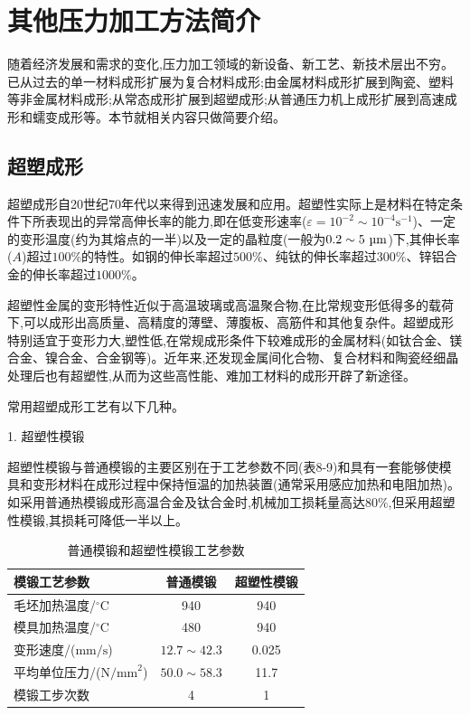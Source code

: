 \documentclass[UTF8]{ctexbook}
\newcommand{\◎}{\ensuremath{\bigcirc}}
\begin{document}
\section{其他压力加工方法简介}
随着经济发展和需求的变化,压力加工领域的新设备、新工艺、新技术层出不穷。已从过去的单一材料成形扩展为复合材料成形;由金属材料成形扩展到陶瓷、塑料等非金属材料成形;从常态成形扩展到超塑成形;从普通压力机上成形扩展到高速成形和蠕变成形等。本节就相关内容只做简要介绍。

\subsection{超塑成形}
超塑成形自20世纪70年代以来得到迅速发展和应用。超塑性实际上是材料在特定条件下所表现出的异常高伸长率的能力,即在低变形速率($\varepsilon=10^{-2}\sim 10^{-4}\text{s}^{-1}$)、一定的变形温度(约为其熔点的一半)以及一定的晶粒度(一般为$0.2\sim 5\text{ \textmu m}$)下,其伸长率($A$)超过$100\%$的特性。如钢的伸长率超过$500\%$、纯钛的伸长率超过$300\%$、锌铝合金的伸长率超过$1000\%$。

超塑性金属的变形特性近似于高温玻璃或高温聚合物,在比常规变形低得多的载荷下,可以成形出高质量、高精度的薄壁、薄腹板、高筋件和其他复杂件。超塑成形特别适宜于变形力大,塑性低,在常规成形条件下较难成形的金属材料(如钛合金、镁合金、镍合金、合金钢等)。近年来,还发现金属间化合物、复合材料和陶瓷经细晶处理后也有超塑性,从而为这些高性能、难加工材料的成形开辟了新途径。

常用超塑成形工艺有以下几种。

    1. 超塑性模锻
    
    超塑性模锻与普通模锻的主要区别在于工艺参数不同(表8-9)和具有一套能够使模具和变形材料在成形过程中保持恒温的加热装置(通常采用感应加热和电阻加热)。如采用普通热模锻成形高温合金及钛合金时,机械加工损耗量高达$80\%$,但采用超塑性模锻,其损耗可降低一半以上。
    
    \begin{longtable}[]{|l|c|c|}
        
        \caption{普通模锻和超塑性模锻工艺参数}\\
        
        
            \hline
            模锻工艺参数 & 普通模锻 & 超塑性模锻 \\
            \hline
            毛坯加热温度/$^\circ\text{C}$ & 940 & 940 \\
            模具加热温度/$^\circ\text{C}$ & 480 & 940 \\
            变形速度/($\text{mm/s}$) & $12.7\sim 42.3$ & 0.025 \\
            平均单位压力/($\text{N/mm}^2$) & $50.0\sim 58.3$ & 11.7 \\
            模锻工步次数 & 4 & 1 \\
            \hline
        
    \end{longtable}
\end{document}
